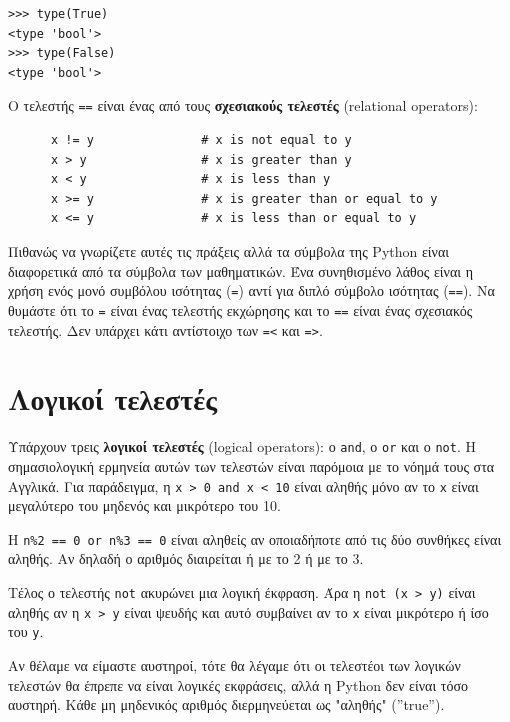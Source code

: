 \documentclass[10pt]{book}
\begin{document}
\begin{verbatim}
>>> type(True)
<type 'bool'>
>>> type(False)
<type 'bool'>
\end{verbatim}
%

Ο τελεστής {\tt ==} είναι ένας από τους {\bf σχεσιακούς τελεστές} (relational operators):

\begin{verbatim}
      x != y               # x is not equal to y
      x > y                # x is greater than y
      x < y                # x is less than y
      x >= y               # x is greater than or equal to y
      x <= y               # x is less than or equal to y
\end{verbatim}
%

Πιθανώς να γνωρίζετε αυτές τις πράξεις αλλά τα σύμβολα της Python
είναι διαφορετικά από τα σύμβολα των μαθηματικών. Ένα συνηθισμένο λάθος είναι η χρήση ενός μονό συμβόλου ισότητας ({\tt =}) αντί για διπλό σύμβολο ισότητας ({\tt ==}). Να θυμάστε ότι το {\tt =} είναι ένας τελεστής εκχώρησης και το {\tt ==} είναι ένας σχεσιακός τελεστής. Δεν υπάρχει κάτι αντίστοιχο των {\tt =<} και {\tt =>}.


\section{Λογικοί τελεστές}

Υπάρχουν τρεις {\bf λογικοί τελεστές} (logical operators): ο {\tt and}, ο {\tt or} και ο {\tt not}. Η σημασιολογική ερμηνεία αυτών των τελεστών είναι παρόμοια με το νόημά τους στα Αγγλικά. Για παράδειγμα, η {\tt x > 0 and x < 10} είναι αληθής μόνο αν το {\tt x} είναι μεγαλύτερο του μηδενός και μικρότερο του 10.

Η {\tt n\%2 == 0 or n\%3 == 0} είναι αληθείς αν οποιαδήποτε από τις δύο συνθήκες είναι αληθής. Αν δηλαδή ο αριθμός διαιρείται ή με το 2 ή με το 3.

Τέλος ο τελεστής {\tt not} ακυρώνει μια λογική έκφραση. Άρα η {\tt not (x > y)} είναι αληθής αν η {\tt x > y} είναι ψευδής και αυτό συμβαίνει αν το {\tt x} είναι μικρότερο ή ίσο του {\tt y}.

Αν θέλαμε να είμαστε αυστηροί, τότε θα λέγαμε ότι οι τελεστέοι των λογικών τελεστών θα έπρεπε να είναι λογικές εκφράσεις, αλλά η Python δεν είναι τόσο αυστηρή. Κάθε μη μηδενικός αριθμός διερμηνεύεται ως "αληθής" (''true'').
\end{document}
